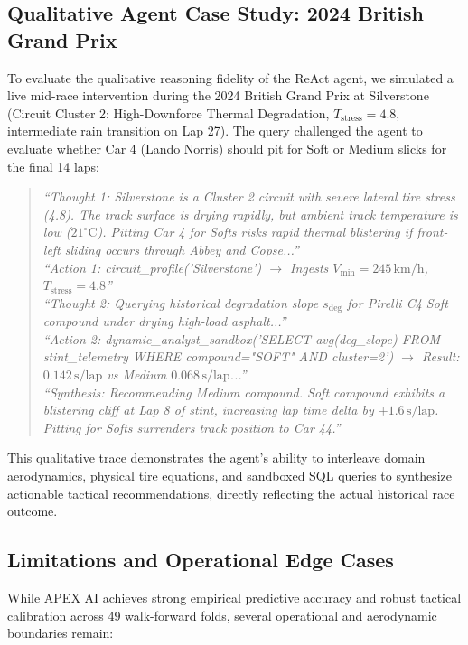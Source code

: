 \documentclass[journal]{IEEEtran}
\begin{document}
\subsection{Qualitative Agent Case Study: 2024 British Grand Prix}
To evaluate the qualitative reasoning fidelity of the ReAct agent, we simulated a live mid-race intervention during the 2024 British Grand Prix at Silverstone (Circuit Cluster 2: High-Downforce Thermal Degradation, $T_{\text{stress}} = 4.8$, intermediate rain transition on Lap 27). The query challenged the agent to evaluate whether Car 4 (Lando Norris) should pit for Soft or Medium slicks for the final 14 laps:
\begin{quote}
\textit{``Thought 1: Silverstone is a Cluster 2 circuit with severe lateral tire stress (4.8). The track surface is drying rapidly, but ambient track temperature is low ($21^\circ\text{C}$). Pitting Car 4 for Softs risks rapid thermal blistering if front-left sliding occurs through Abbey and Copse...''} \\
\textit{``Action 1: circuit\_profile('Silverstone') $\to$ Ingests $V_{\text{min}} = 245\,\text{km/h}$, $T_{\text{stress}} = 4.8$''} \\
\textit{``Thought 2: Querying historical degradation slope $s_{\text{deg}}$ for Pirelli C4 Soft compound under drying high-load asphalt...''} \\
\textit{``Action 2: dynamic\_analyst\_sandbox('SELECT avg(deg\_slope) FROM stint\_telemetry WHERE compound="SOFT" AND cluster=2') $\to$ Result: $0.142\,\text{s/lap}$ vs Medium $0.068\,\text{s/lap}$...''} \\
\textit{``Synthesis: Recommending Medium compound. Soft compound exhibits a blistering cliff at Lap 8 of stint, increasing lap time delta by $+1.6\,\text{s/lap}$. Pitting for Softs surrenders track position to Car 44.''}
\end{quote}
This qualitative trace demonstrates the agent's ability to interleave domain aerodynamics, physical tire equations, and sandboxed SQL queries to synthesize actionable tactical recommendations, directly reflecting the actual historical race outcome.

\subsection{Limitations and Operational Edge Cases}
While APEX AI achieves strong empirical predictive accuracy and robust tactical calibration across 49 walk-forward folds, several operational and aerodynamic boundaries remain:
\end{document}

